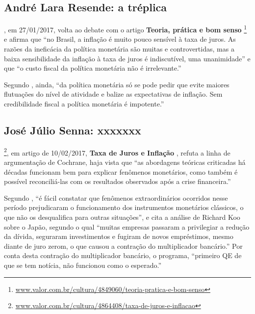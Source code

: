\documentclass[]{article}
\let\rmarkdownfootnote\footnote%
\def\footnote{\protect\rmarkdownfootnote}
\begin{document}
\subsection{André Lara Resende: a
tréplica}\label{andre-lara-resende-a-treplica}

, em 27/01/2017, volta ao debate com o artigo
\textbf{Teoria, prática e bom senso} \cite{resende2}\footnote{\href{http://www.valor.com.br/cultura/4849060/teoria-pratica-e-bom-senso}{www.valor.com.br/cultura/4849060/teoria-pratica-e-bom-senso}}
e afirma que ``no Brasil, a inflação é muito pouco sensível à taxa de
juros. As razões da ineficácia da política monetária são muitas e
controvertidas, mas a baixa sensibilidade da inflação à taxa de juros é
indiscutível, uma unanimidade'' e que ``o custo fiscal da política
monetária não é irrelevante.''

Segundo , ainda, ``da política monetária só
se pode pedir que evite maiores flutuações do nível de atividade e
balize as expectativas de inflação. Sem credibilidade fiscal a política
monetária é impotente.''

\subsection{José Júlio Senna: xxxxxxx}\label{jose-julio-senna-xxxxxxx}

\footnote{\href{http://www.valor.com.br/cultura/4864408/taxa-de-juros-e-inflacao}{www.valor.com.br/cultura/4864408/taxa-de-juros-e-inflacao}},
em artigo de 10/02/2017, \textbf{Taxa de Juros e Inflação} \cite{senna},
refuta a linha de argumentação de Cochrane, haja vista que ``as
abordagens teóricas criticadas há décadas funcionam bem para explicar
fenômenos monetários, como também é possível reconciliá-las com os
resultados observados após a crise financeira.''

Segundo , ``é fácil constatar que fenômenos
extraordinários ocorridos nesse período prejudicaram o funcionamento dos
instrumentos monetários clássicos, o que não os desqualifica para outras
situações'', e cita a análise de Richard Koo sobre o Japão, segundo o
qual ``muitas empresas passaram a privilegiar a redução da dívida,
seguraram investimentos e fugiram de novos empréstimos, mesmo diante de
juro zerom, o que causou a contração do multiplicador bancário.'' Por
conta desta contração do multiplicador bancário, o programa, ``primeiro
QE de que se tem notícia, não funcionou como o esperado.''
\end{document}
